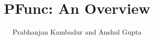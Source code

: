 \documentclass[11pt]{article}
\title{PFunc: An Overview}
\author{Prabhanjan Kambadur and Anshul Gupta}
\begin{document}
\maketitle

\tableofcontents

\pagebreak



\pagebreak



\pagebreak



\pagebreak



\pagebreak



\pagebreak



\pagebreak



\pagebreak



\pagebreak



\pagebreak



\pagebreak



\pagebreak


\end{document}
